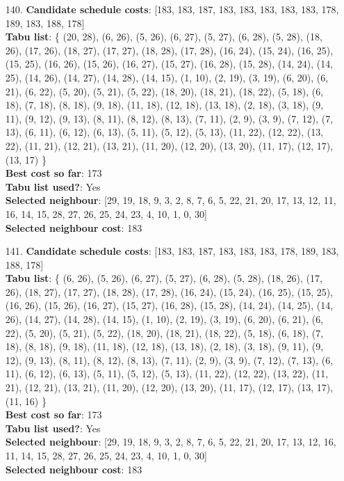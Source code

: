 \documentclass[fleqn]{article}
\begin{document}
\begin{itemize}
    \item[140.] \textbf{Candidate schedule costs}: [183, 183, 187, 183, 183, 183, 183, 183, 178, 189, 183, 188, 178] \\
    \textbf{Tabu list}: \{ (20, 28), (6, 26), (5, 26), (6, 27), (5, 27), (6, 28), (5, 28), (18, 26), (17, 26), (18, 27), (17, 27), (18, 28), (17, 28), (16, 24), (15, 24), (16, 25), (15, 25), (16, 26), (15, 26), (16, 27), (15, 27), (16, 28), (15, 28), (14, 24), (14, 25), (14, 26), (14, 27), (14, 28), (14, 15), (1, 10), (2, 19), (3, 19), (6, 20), (6, 21), (6, 22), (5, 20), (5, 21), (5, 22), (18, 20), (18, 21), (18, 22), (5, 18), (6, 18), (7, 18), (8, 18), (9, 18), (11, 18), (12, 18), (13, 18), (2, 18), (3, 18), (9, 11), (9, 12), (9, 13), (8, 11), (8, 12), (8, 13), (7, 11), (2, 9), (3, 9), (7, 12), (7, 13), (6, 11), (6, 12), (6, 13), (5, 11), (5, 12), (5, 13), (11, 22), (12, 22), (13, 22), (11, 21), (12, 21), (13, 21), (11, 20), (12, 20), (13, 20), (11, 17), (12, 17), (13, 17) \} \\
    \textbf{Best cost so far}: 173 \\
    \textbf{Tabu list used?}: Yes \\
    \textbf{Selected neighbour}: [29, 19, 18, 9, 3, 2, 8, 7, 6, 5, 22, 21, 20, 17, 13, 12, 11, 16, 14, 15, 28, 27, 26, 25, 24, 23, 4, 10, 1, 0, 30] \\
    \textbf{Selected neighbour cost}: 183
      

    \item[141.] \textbf{Candidate schedule costs}: [183, 183, 187, 183, 183, 183, 178, 189, 183, 188, 178] \\
    \textbf{Tabu list}: \{ (6, 26), (5, 26), (6, 27), (5, 27), (6, 28), (5, 28), (18, 26), (17, 26), (18, 27), (17, 27), (18, 28), (17, 28), (16, 24), (15, 24), (16, 25), (15, 25), (16, 26), (15, 26), (16, 27), (15, 27), (16, 28), (15, 28), (14, 24), (14, 25), (14, 26), (14, 27), (14, 28), (14, 15), (1, 10), (2, 19), (3, 19), (6, 20), (6, 21), (6, 22), (5, 20), (5, 21), (5, 22), (18, 20), (18, 21), (18, 22), (5, 18), (6, 18), (7, 18), (8, 18), (9, 18), (11, 18), (12, 18), (13, 18), (2, 18), (3, 18), (9, 11), (9, 12), (9, 13), (8, 11), (8, 12), (8, 13), (7, 11), (2, 9), (3, 9), (7, 12), (7, 13), (6, 11), (6, 12), (6, 13), (5, 11), (5, 12), (5, 13), (11, 22), (12, 22), (13, 22), (11, 21), (12, 21), (13, 21), (11, 20), (12, 20), (13, 20), (11, 17), (12, 17), (13, 17), (11, 16) \} \\
    \textbf{Best cost so far}: 173 \\
    \textbf{Tabu list used?}: Yes \\
    \textbf{Selected neighbour}: [29, 19, 18, 9, 3, 2, 8, 7, 6, 5, 22, 21, 20, 17, 13, 12, 16, 11, 14, 15, 28, 27, 26, 25, 24, 23, 4, 10, 1, 0, 30] \\
    \textbf{Selected neighbour cost}: 183
      


\end{itemize}
\end{document}
